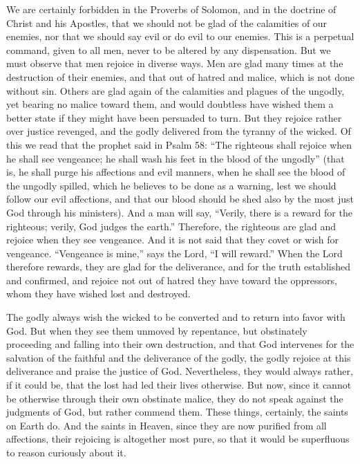 We are certainly forbidden in the Proverbs of Solomon, and in the doctrine of Christ and his Apostles, that we should not be glad of the calamities of our enemies, nor that we should say evil or do evil to our enemies. This is a perpetual command, given to all men, never to be altered by any dispensation. But we must observe that men rejoice in diverse ways. Men are glad many times at the destruction of their enemies, and that out of hatred and malice, which is not done without sin. Others are glad again of the calamities and plagues of the ungodly, yet bearing no malice toward them, and would doubtless have wished them a better state if they might have been persuaded to turn. But they rejoice rather over justice revenged, and the godly delivered from the tyranny of the wicked. Of this we read that the prophet said in Psalm 58: “The righteous shall rejoice when he shall see vengeance; he shall wash his feet in the blood of the ungodly” (that is, he shall purge his affections and evil manners, when he shall see the blood of the ungodly spilled, which he believes to be done as a warning, lest we should follow our evil affections, and that our blood should be shed also by the most just God through his ministers). And a man will say, “Verily, there is a reward for the righteous; verily, God judges the earth.” Therefore, the righteous are glad and rejoice when they see vengeance. And it is not said that they covet or wish for vengeance. “Vengeance is mine,” says the Lord, “I will reward.” When the Lord therefore rewards, they are glad for the deliverance, and for the truth established and confirmed, and rejoice not out of hatred they have toward the oppressors, whom they have wished lost and destroyed.

The godly always wish the wicked to be converted and to return into favor with God. But when they see them unmoved by repentance, but obstinately proceeding and falling into their own destruction, and that God intervenes for the salvation of the faithful and the deliverance of the godly, the godly rejoice at this deliverance and praise the justice of God. Nevertheless, they would always rather, if it could be, that the lost had led their lives otherwise. But now, since it cannot be otherwise through their own obstinate malice, they do not speak against the judgments of God, but rather commend them. These things, certainly, the saints on Earth do. And the saints in Heaven, since they are now purified from all affections, their rejoicing is altogether most pure, so that it would be superfluous to reason curiously about it.

